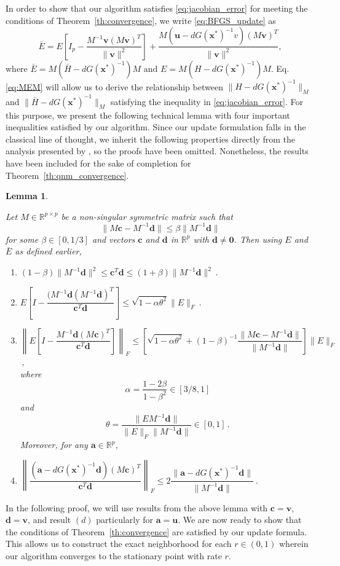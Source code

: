 \documentclass{statsoc}
\newtheorem{lemma}{Lemma}
\newcommand{\ba}{\boldsymbol{a}}
\newcommand{\bc}{\boldsymbol{c}}
\newcommand{\bd}{\boldsymbol{d}}
\newcommand{\bu}{\boldsymbol{u}}
\newcommand{\bv}{\boldsymbol{v}}
\newcommand{\bx}{\boldsymbol{x}}
\begin{document}
In order to show that our algorithm satisfies \eqref{eq:jacobian_error} for meeting the conditions of Theorem~\ref{th:convergence}, we write \eqref{eq:BFGS_update} as
\begin{equation} \label{eq:MEM}
    \bar{E} = E\left[I_p - \dfrac{M^{-1}\bv(M\bv)^T}{\|\bv\|^2}\right] + \dfrac{M(\bu - dG(\bx^\ast)^{-1}v)(M\bv)^T}{\|\bv\|^2},
\end{equation}
where $\bar{E} = M(\bar{H} - dG(\bx^\ast)^{-1})M \text{ and } E = M(H - dG(\bx^\ast)^{-1})M$. Eq.\eqref{eq:MEM} will allow us to derive the relationship between $\|H-dG(\bx^\ast)^{-1}\|_M$ and $\|\bar{H}-dG(\bx^\ast)^{-1}\|_M$ satisfying the inequality in \eqref{eq:jacobian_error}. For this purpose, we present the following technical lemma with four important inequalities satisfied by our algorithm. Since our update formulation falls in the classical line of thought, we inherit the following properties directly from the analysis presented by \cite{broyden1973local}, so the proofs have been omitted. Nonetheless, the results have been included for the sake of completion for Theorem~\ref{th:qnm_convergence}.
\begin{lemma} \label{lemma:MEM}

Let $M \in \mathbb{R}^{p\times p}$ be a non-singular symmetric matrix such that
\begin{equation} \label{eq:lemma2_condition}
    \|M\bc - M^{-1}\bd\| \leq \beta \|M^{-1}\bd\|
\end{equation}
for some $\beta \in [0, 1/3]$ and vectors $\bc$ and $\bd$ in $\mathbb{R}^p$ with $\bd \neq \mathbf{0}$. Then using $E$ and $\bar{E}$ as defined earlier,
\begin{enumerate}
    \item $(1 - \beta)\|M^{-1}\bd\|^2 \leq \bc^T\bd \leq (1 + \beta) \|M^{-1}\bd\|^2$\,.
    \item $E\left[I - \dfrac{(M^{-1}\bd(M^{-1}\bd)^T}{\bc^T\bd}\right] \leq \sqrt{1 - \alpha \theta^2} \|E\|_F$\,.
    \item $\left\|E \left[I - \dfrac{M^{-1}\bd (M\bc)^T}{\bc^T\bd}\right]\right\|_F \leq \left[ \sqrt{1 - \alpha \theta^2} + (1-\beta)^{-1} \dfrac{\|M\bc - M^{-1}\bd\|}{\|M^{-1}\bd\|} \right]\|E\|_F $\,, \\
    where
    \[
    \alpha = \dfrac{1 - 2\beta}{1  - \beta^2} \in [3/8, 1]
    \]
    and 
    \[
    \theta  = \dfrac{\|EM^{-1}\bd\|}{\|E\|_F\|M^{-1}\bd\|} \in [0,1]\,.
    \]
    Moreover, for any $\ba \in \mathbb{R}^p$,
    
    \item $\left\| \dfrac{(\ba - dG(\bx^\ast)^{-1}\bd)(M\bc)^T}{\bc^T\bd} \right\|_F \leq 2\dfrac{\|\ba - dG(\bx^\ast)^{-1}\bd\|}{\|M^{-1}\bd\|}$\,.
\end{enumerate}
\end{lemma}
In the following proof, we will use results from the above lemma with $\bc = \bv$, $\bd= \bv$, and result $(d)$ particularly for $\ba = \bu$. We are now ready to show that the conditions of Theorem~\ref{th:convergence} are satisfied by our update formula. This allows us to construct the exact neighborhood for each $r \in (0,1)$ wherein our algorithm converges to the stationary point with rate $r$.
\end{document}

